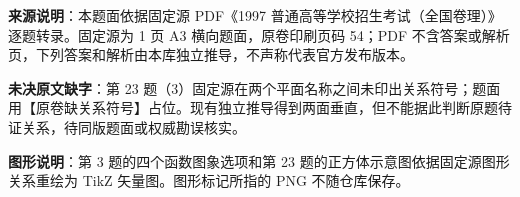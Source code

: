 


\begin{gktip}
\textbf{来源说明}：本题面依据固定源 PDF《1997 普通高等学校招生考试（全国卷理）》逐题转录。固定源为 1 页 A3 横向题面，原卷印刷页码 54；PDF 不含答案或解析页，下列答案和解析由本库独立推导，不声称代表官方发布版本。

\textbf{未决原文缺字}：第 23 题（3）固定源在两个平面名称之间未印出关系符号；题面用【原卷缺关系符号】占位。现有独立推导得到两面垂直，但不能据此判断原题待证关系，待同版题面或权威勘误核实。

\textbf{图形说明}：第 3 题的四个函数图象选项和第 23 题的正方体示意图依据固定源图形关系重绘为 TikZ 矢量图。图形标记所指的 PNG 不随仓库保存。
\end{gktip}

